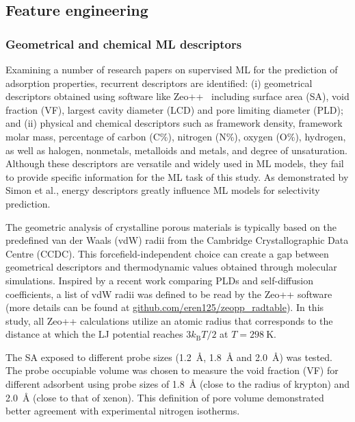 \documentclass[main]{subfiles}
\begin{document}
\subsection{Feature engineering}

\subsubsection{Geometrical and chemical ML descriptors}

Examining a number of research papers on supervised ML for the prediction of adsorption properties,\autocite{Fernandez_2013,Simon_2015,Fanourgakis_2020,Anderson_2020,Pardakhti_2020} recurrent descriptors are identified: (i) geometrical descriptors obtained using software like Zeo++~\autocite{zeopp_Willems2012} including surface area (SA), void fraction (VF), largest cavity diameter (LCD) and pore limiting diameter (PLD); and (ii) physical and chemical descriptors such as framework density, framework molar mass, percentage of carbon (C\%), nitrogen (N\%), oxygen (O\%), hydrogen, as well as halogen, nonmetals, metalloids and metals, and degree of unsaturation. Although these descriptors are versatile and widely used in ML models, they fail to provide specific information for the ML task of this study. As demonstrated by Simon et al., energy descriptors greatly influence ML models for selectivity prediction.

The geometric analysis of crystalline porous materials is typically based on the predefined van der Waals (vdW) radii from the Cambridge Crystallographic Data Centre (CCDC). This forcefield-independent choice can create a gap between geometrical descriptors and thermodynamic values obtained through molecular simulations. Inspired by a recent work comparing PLDs and self-diffusion coefficients,\autocite{Hung_2021} a list of vdW radii was defined to be read by the Zeo++ software (more details can be found at \url{github.com/eren125/zeopp_radtable}). In this study, all Zeo++ calculations utilize an atomic radius that corresponds to the distance at which the LJ potential reaches $3 k_\text{B} T/2$ at $T = \SI{298}{\kelvin}$.

The SA exposed to different probe sizes (\SI{1.2}{\angstrom}, \SI{1.8}{\angstrom} and \SI{2.0}{\angstrom}) was tested. The probe occupiable volume was chosen to measure the void fraction (VF) for different adsorbent using probe sizes of \SI{1.8}{\angstrom} (close to the radius of krypton) and \SI{2.0}{\angstrom} (close to that of xenon). This definition of pore volume demonstrated better agreement with experimental nitrogen isotherms.\autocite{vol_Ongari2017}
\end{document}
